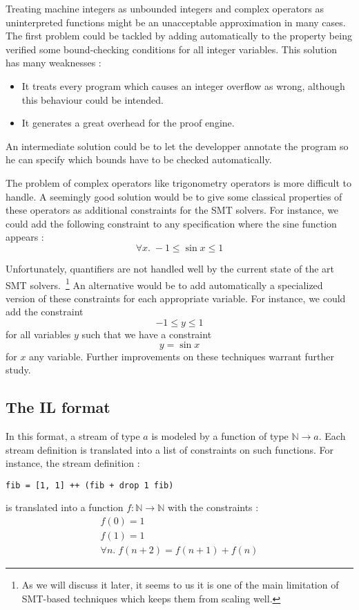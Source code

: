 Treating machine integers as unbounded integers and complex operators as uninterpreted functions might be an unacceptable approximation in many cases. The first problem could be tackled by adding automatically to the property being verified some bound-checking conditions for all integer variables. This solution has many weaknesses :

\begin{itemize}
\item It treats every program which causes an integer overflow as wrong, although this behaviour could be intended.
\item It generates a great overhead for the proof engine.
\end{itemize}

An intermediate solution could be to let the developper annotate the program so he can specify which bounds have to be checked automatically.


\medskip

The problem of complex operators like trigonometry operators is more difficult to handle. A seemingly good solution would be to give some classical properties of these operators as additional constraints for the SMT solvers. For instance, we could add the following constraint to any specification where the sine function appears : \[ \forall x . \; -1 \leq \sin x \leq 1 \]

Unfortunately, quantifiers are not handled well by the current state
of the art SMT solvers.~\footnote{As we will discuss it later, it
  seems to us it is one of the main limitation of SMT-based techniques
  which keeps them from scaling well.} An alternative would be to add
automatically a specialized version of these constraints for each
appropriate variable. For instance, we could add the constraint \[-1
\leq y \leq 1 \] for all variables $y$ such that we have a
constraint \[ y = \sin x \] for $x$ any variable.  Further
improvements on these techniques warrant further study.





\subsection{The \textbf{IL} format}

In this format, a stream of type $a$ is modeled by a function of type $\mathbb{N} \to a$. Each stream definition is translated into a list of constraints on such functions. For instance, the stream definition :
\begin{lstlisting}[frame=single]
fib = [1, 1] ++ (fib + drop 1 fib)
\end{lstlisting}
is translated into a function $f : \mathbb{N} \to \mathbb{N}$ with the constraints :
$$
\begin{array}{c}
f(0) = 1 \\
f(1) = 1 \\
\forall n . \; f(n + 2) = f(n + 1) + f(n)
\end{array}
$$

